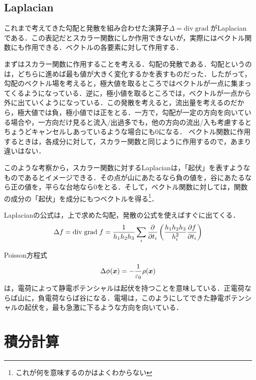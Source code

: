 \documentclass[a4paper,10pt,uplatex]{jsarticle}
\renewcommand{\div}{\mathrm{div}\;}
\renewcommand{\grad}{\mathrm{grad}\;}
\newcommand{\x}{\vb*{x}}
\begin{document}
\subsection{Laplacian}
これまで考えてきた勾配と発散を組み合わせた演算子$\Delta = \div \grad$がLaplacianである．この表記だとスカラー関数にしか作用できないが，実際にはベクトル関数にも作用できる．ベクトルの各要素に対して作用する．

まずはスカラー関数に作用することを考える．勾配の発散である．勾配というのは，どちらに進めば最も値が大きく変化するかを表すものだった．したがって，勾配のベクトル場を考えると，極大値を取るところではベクトルが一点に集まってくるようになっている．逆に，極小値を取るところでは，ベクトルが一点から外に出ていくようになっている．この発散を考えると，流出量を考えるのだから，極大値では負，極小値では正をとる．一方で，勾配が一定の方向を向いている場合や，一方向だけ見ると流入/出過多でも，他の方向の流出/入も考慮するとちょうどキャンセルしあっているような場合にも0になる．
ベクトル関数に作用するときは，各成分に対して，スカラー関数と同じように作用するので，あまり違いはない．

このような考察から，スカラー関数に対するLaplacianは，「起伏」を表すようなものであるとイメージできる．その点が山にあたるなら負の値を，谷にあたるなら正の値を，平らな台地なら0をとる．そして，ベクトル関数に対しては，関数の成分の「起伏」を成分にもつベクトルを得る\footnote{これが何を意味するのかはよくわからない}．

Laplacianの公式は，上で求めた勾配，発散の公式を使えばすぐに出てくる．
\begin{equation}
    \Delta f = \div \grad f = \frac{1}{h_1h_2h_3} \sum_i \pdv{t_i}\left(\frac{h_1h_2h_3}{h_i^2}\pdv{f}{t_i}\right)
\end{equation}

Poisson方程式
\begin{equation}
    \Delta \phi(\x) = -\frac{1}{\varepsilon_0}\rho(\x)
\end{equation}
は，電荷によって静電ポテンシャルは起伏を持つことを意味している．正電荷ならば山に，負電荷ならば谷になる．電場は，このようにしてできた静電ポテンシャルの起伏を，最も急激に下るような方向を向いている．

\section{積分計算}
\end{document}

